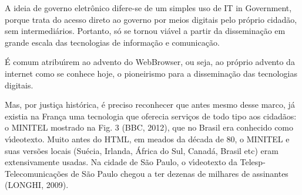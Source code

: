 \documentclass[
12pt,		%
openright,	%
twoside,  %
a4paper,			%
chapter=TITLE,		%
english,			%
french,				%
spanish,			%
brazil				%
]{USPSC-classe/USPSC}
\begin{document}
A ideia de governo eletr\^onico difere-se de um simples uso de \textquotedbl IT in Government\textquotedbl , porque trata do acesso direto ao governo por meios digitais pelo pr\'oprio cidad\~ao, sem intermedi\'arios. Portanto, s\'o se tornou vi\'avel a partir da dissemina\c{c}\~ao em grande escala das tecnologias de informa\c{c}\~ao e comunica\c{c}\~ao.

















\'E comum atribu\'{\i}rem ao advento do WebBrowser, ou seja, ao pr\'oprio advento da internet como se conhece hoje, o pioneirismo para a dissemina\c{c}\~ao das tecnologias digitais.

















Mas, por justi\c{c}a hist\'orica, \'e preciso reconhecer que antes mesmo desse marco, j\'a existia na Fran\c{c}a uma tecnologia que oferecia servi\c{c}os de todo tipo aos cidad\~aos: o MINITEL mostrado na Fig. 3 (BBC, 2012), que no Brasil era conhecido como v\'{\i}deotexto. Muito antes do HTML, em meados da d\'ecada de 80, o MINITEL e suas vers\~oes locais (Su\'ecia, Irlanda, \'Africa do Sul, Canad\'a, Brasil etc) eram extensivamente usadas. Na cidade de S\~ao Paulo, o v\'{\i}deotexto da Telesp- Telecomunica\c{c}\~oes de S\~ao Paulo chegou a ter dezenas de milhares de assinantes (LONGHI, 2009).
\end{document}

